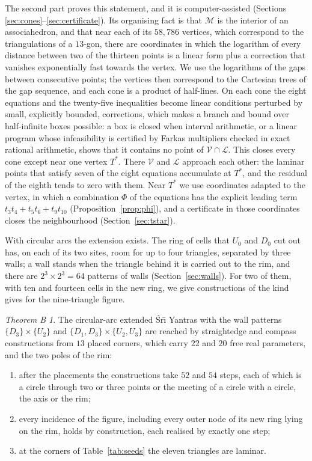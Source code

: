 \documentclass[11pt,a4paper]{article}
\theoremstyle{definition}
\theoremstyle{remark}
\newtheorem*{theoremB}{Theorem B}
\newcommand{\Sri}{\'Sr\={\i}}
\newcommand{\Mo}{\mathcal{M}}
\newcommand{\V}{\mathcal{V}}
\newcommand{\Lam}{\mathcal{L}}
\newcommand{\Tstar}{T^{*}}
\begin{document}
The second part proves this statement, and it is computer-assisted (Sections
\ref{sec:cones}--\ref{sec:certificate}). Its organising fact is that $\Mo$ is the interior of an
associahedron, and that near each of its $58{,}786$ vertices, which correspond to the triangulations of a
$13$-gon, there are coordinates in which the logarithm of every distance between two of the thirteen points
is a linear form plus a correction that vanishes exponentially fast towards the vertex. We use the logarithms of the
gaps between consecutive points; the vertices then correspond to the Cartesian trees of the gap sequence,
and each cone is a product of half-lines. On each cone the eight equations and the twenty-five
inequalities become linear conditions perturbed by small, explicitly bounded, corrections, which makes a
branch and bound over half-infinite boxes possible: a box is closed when interval arithmetic, or a linear
program whose infeasibility is certified by Farkas multipliers checked in exact rational arithmetic, shows
that it contains no point of $\V \cap \Lam$. This closes every cone except near one vertex $\Tstar$. There
$\V$ and $\Lam$ approach each other: the laminar points that satisfy seven of the eight equations
accumulate at $\Tstar$, and the residual of the eighth tends to zero with them. Near $\Tstar$ we use
coordinates adapted to the vertex, in which a combination $\Phi$ of the equations has the explicit
leading term $t_3t_4 + t_5t_6 + t_9t_{10}$ (Proposition~\ref{prop:phi}), and a certificate in those
coordinates closes the neighbourhood (Section~\ref{sec:tstar}).

With circular arcs the extension exists. The ring of cells that $U_0$ and $D_0$ cut out has, on each of its
two sites, room for up to four triangles, separated by three walls; a wall stands when the triangle behind
it is carried out to the rim, and there are $2^3 \times 2^3 = 64$ patterns of walls
(Section~\ref{sec:walls}). For two of them, with ten and fourteen cells in the new ring, we give
constructions of the kind \cite{CK} gives for the nine-triangle figure.

\begin{theoremB}
The circular-arc extended \Sri{} Yantras with the wall patterns $\{D_3\}\times\{U_2\}$ and
$\{D_1,D_3\}\times\{U_2,U_3\}$ are reached by straightedge and compass constructions from $13$ placed
corners, which carry $22$ and $20$ free real parameters, and the two poles of the rim:
\begin{enumerate}[label=(\roman*),leftmargin=2.5em]
\item after the placements the constructions take $52$ and $54$ steps, each of which is a circle through two
or three points or the meeting of a circle with a circle, the axis or the rim;
\item every incidence of the figure, including every outer node of its new ring lying on the rim, holds by
construction, each realised by exactly one step;
\item at the corners of Table~\ref{tab:seeds} the eleven triangles are laminar.
\end{enumerate}
\end{theoremB}
\end{document}

